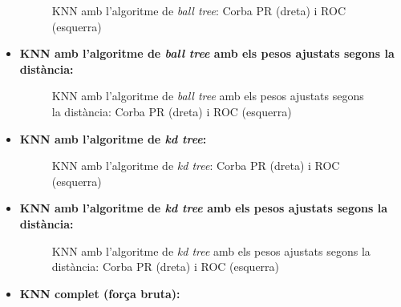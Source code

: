 \documentclass[a4paper, 11pt]{article}
\begin{document}
\begin{itemize}
                \begin{figure}[H]%
                \centering
                \qquad
                \caption*{KNN amb l'algoritme de \textit{ball tree}: Corba PR (dreta) i ROC (esquerra)}
                \end{figure}


            \item \textbf{KNN amb l'algoritme de \textit{ball tree} amb els pesos ajustats segons la distància:}


                \begin{figure}[H]%
                \centering
                \qquad
                \caption*{KNN amb l'algoritme de \textit{ball tree} amb els pesos ajustats segons la distància: Corba PR (dreta) i ROC (esquerra)}
                \end{figure}

            \newpage
            \item \textbf{KNN amb l'algoritme de \textit{kd tree}:}


                \begin{figure}[H]%
                \centering
                \qquad
                \caption*{KNN amb l'algoritme de \textit{kd tree}: Corba PR (dreta) i ROC (esquerra)}
                \end{figure}

            \item \textbf{KNN amb l'algoritme de \textit{kd tree} amb els pesos ajustats segons la distància:}


                \begin{figure}[H]%
                \centering
                \qquad
                \caption*{KNN amb l'algoritme de \textit{kd tree} amb els pesos ajustats segons la distància: Corba PR (dreta) i ROC (esquerra)}
                \end{figure}
            \newpage
            \item \textbf{KNN complet (força bruta):}



\end{itemize}
\end{document}
